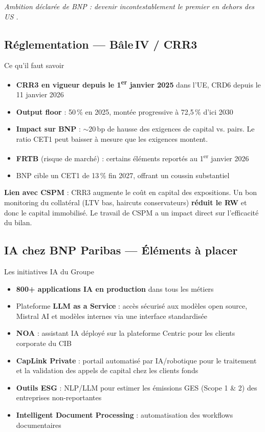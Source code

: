 \documentclass[11pt,a4paper]{article}
\begin{document}
\textit{Ambition d\'eclar\'ee de BNP : devenir \og incontestablement le premier en dehors
des US \fg{}.}

\subsection{R\'eglementation --- B\^ale\,IV / CRR3}

\begin{graybox}{Ce qu'il faut savoir}
\begin{itemize}[nosep, leftmargin=12pt]
\item \textbf{CRR3 en vigueur depuis le 1\textsuperscript{er} janvier 2025} dans l'UE,
      CRD6 depuis le 11 janvier 2026
\item \textbf{Output floor} : 50\,\% en 2025, mont\'ee progressive \`a 72,5\,\% d'ici 2030
\item \textbf{Impact sur BNP} : $\sim$20\,bp de hausse des exigences de capital vs. pairs.
      Le ratio CET1 peut baisser \`a mesure que les exigences montent.
\item \textbf{FRTB} (risque de march\'e) : certains \'el\'ements report\'es au 1\textsuperscript{er}
      janvier 2026
\item BNP cible un CET1 de 13\,\% fin 2027, offrant un coussin substantiel
\end{itemize}
\textbf{Lien avec CSPM} : CRR3 augmente le co\^ut en capital des expositions.
Un bon monitoring du collat\'eral (LTV bas, haircuts conservateurs) \textbf{r\'eduit le RW}
et donc le capital immobilis\'e. Le travail de CSPM a un impact direct sur l'efficacit\'e
du bilan.
\end{graybox}

\subsection{IA chez BNP Paribas --- \'El\'ements \`a placer}

\begin{graybox}{Les initiatives IA du Groupe}
\begin{itemize}[nosep, leftmargin=12pt]
\item \textbf{800+ applications IA en production} dans tous les m\'etiers
\item Plateforme \textbf{\og LLM as a Service \fg{}} : acc\`es s\'ecuris\'e aux mod\`eles
      open source, Mistral AI et mod\`eles internes via une interface standardis\'ee
\item \textbf{NOA} : assistant IA d\'eploy\'e sur la plateforme Centric pour les clients
      corporate du CIB
\item \textbf{CapLink Private} : portail automatis\'e par IA/robotique pour le traitement
      et la validation des appels de capital chez les clients fonds
\item \textbf{Outils ESG} : NLP/LLM pour estimer les \'emissions GES (Scope 1 \& 2)
      des entreprises non-reportantes
\item \textbf{Intelligent Document Processing} : automatisation des workflows documentaires
\end{itemize}
\end{graybox}
\end{document}

